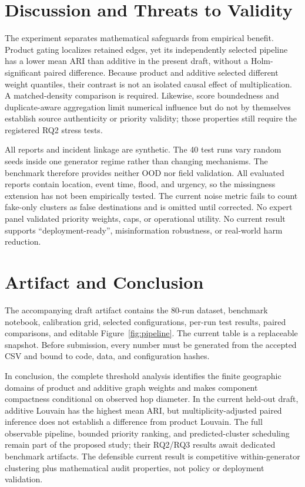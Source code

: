 \documentclass[runningheads]{llncs}
\begin{document}
\section{Discussion and Threats to Validity}

The experiment separates mathematical safeguards from empirical benefit.
Product gating localizes retained edges, yet its independently selected
pipeline has a lower mean ARI than additive in the present draft, without a
Holm-significant paired difference. Because product and additive selected
different weight quantiles, their contrast is not an isolated causal effect of
multiplication. A matched-density comparison is required. Likewise, score
boundedness and duplicate-aware aggregation limit numerical influence but do
not by themselves establish source authenticity or priority validity; those
properties still require the registered RQ2 stress tests.

All reports and incident linkage are synthetic. The 40 test runs vary random
seeds inside one generator regime rather than changing mechanisms. The
benchmark therefore provides neither OOD nor field validation. All evaluated
reports contain location, event time, flood, and urgency, so the missingness
extension has not been empirically tested. The current noise metric fails to
count fake-only clusters as false destinations and is omitted until corrected.
No expert panel validated priority weights, caps, or operational utility. No
current result supports ``deployment-ready'', misinformation robustness, or
real-world harm reduction.

\section{Artifact and Conclusion}

The accompanying draft artifact contains the 80-run dataset, benchmark
notebook, calibration grid, selected configurations, per-run test results,
paired comparisons, and editable Figure~\ref{fig:pipeline}. The current table
is a replaceable snapshot. Before submission, every number must be generated
from the accepted CSV and bound to code, data, and configuration hashes.

In conclusion, the complete threshold analysis identifies the finite
geographic domains of product and additive graph weights and makes component
compactness conditional on observed hop diameter. In the current held-out
draft, additive Louvain has the highest mean ARI, but multiplicity-adjusted
paired inference does not establish a difference from product Louvain. The
full observable pipeline, bounded priority ranking, and predicted-cluster
scheduling remain part of the proposed study; their RQ2/RQ3 results await
dedicated benchmark artifacts. The defensible current result is competitive
within-generator clustering plus mathematical audit properties, not policy or
deployment validation.



\end{document}
